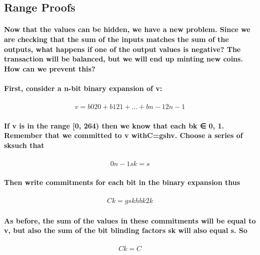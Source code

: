 \documentclass{article}
\begin{document}
\subsection{Range Proofs}

\paragraph{Now that the values can be hidden, we have a new problem.  Since we are checking that the sum of the inputs matches the sum of the outputs, what happens if one of the output values is negative?  The transaction will be balanced, but we will end up minting new coins.  How can we prevent this?}

\paragraph{First, consider a n-bit binary expansion of v:}

\begin{eqnarray}
  v=b020+ b121+ … + bn-12n-1
\end{eqnarray}

\paragraph{If v is in the range [0, 264) then we know that each bk ∈ {0, 1}.  Remember that we committed to v withC=gshv.  Choose a series of sksuch that}

\begin{eqnarray}
  0n-1sk=s 
\end{eqnarray}

\paragraph{Then write commitments for each bit in the binary expansion thus}

\begin{eqnarray}
  Ck=gskhbk2k
\end{eqnarray}

\paragraph{As before, the sum of the values in these commitments will be equal to v, but also the sum of the bit blinding factors sk will also equal s.  So}

\begin{eqnarray}
  Ck=C
\end{eqnarray}
\end{document}
